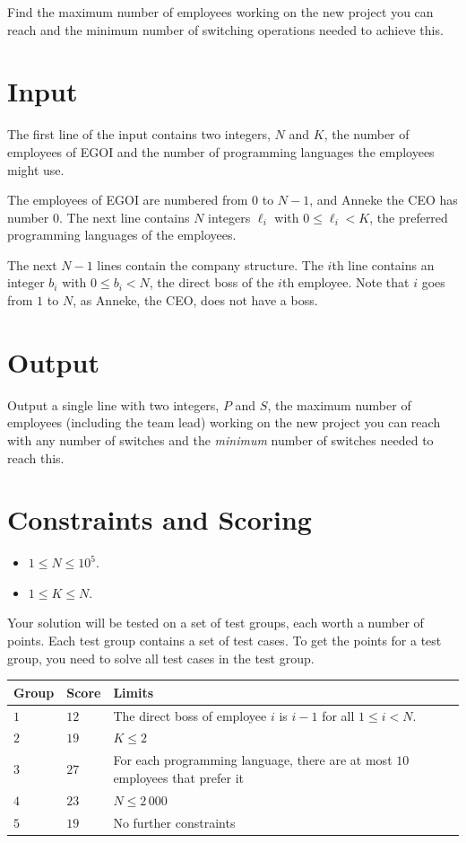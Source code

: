 Find the maximum number of employees working on the new project you can reach and the minimum number of switching operations needed to achieve this.

\section*{Input}
The first line of the input contains two integers, $N$ and $K$, the number of employees of EGOI and the number of programming languages the employees might use.

The employees of EGOI are numbered from $0$ to $N-1$, and Anneke the CEO has number $0$.
The next line contains $N$ integers $\ell_i$ with $0\le \ell_i<K$, the preferred programming languages of the employees.

The next $N-1$ lines contain the company structure.
The $i$th line contains an integer $b_i$ with $0\le b_i<N$, the direct boss of the $i$th employee. Note that $i$ goes from $1$ to $N$, as Anneke, the CEO, does not have a boss.

\section*{Output}
Output a single line with two integers, $P$ and $S$, the maximum number of employees (including the team lead) working on the new project you can reach with any number of switches and the \emph{minimum} number of switches needed to reach this.

\section*{Constraints and Scoring}
\begin{itemize}
  \item $1 \le N \le 10^5$.
  \item $1 \le K \le N$.
\end{itemize}

\noindent
Your solution will be tested on a set of test groups, each worth a number of points.
Each test group contains a set of test cases. To get the points for a test group, you need to
solve all test cases in the test group.

\noindent
\begin{tabular}{| l | l | p{12cm} |}
  \hline
  Group & Score & Limits \\ \hline
  $1$   & $12$      & The direct boss of employee $i$ is $i-1$ for all $1\le i<N$.  \\ \hline
  $2$   & $19$      & $K\le 2$\\ \hline
  $3$   & $27$      & For each programming language, there are at most $10$ employees that prefer it\\ \hline
  $4$   & $23$      & $N\le 2\,000$ \\ \hline
  $5$   & $19$      & No further constraints \\ \hline

\end{tabular}

